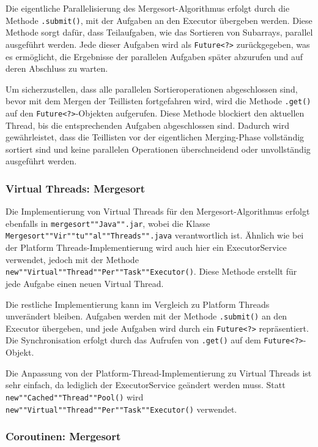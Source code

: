 \documentclass[fontsize=12pt,paper=a4,twoside=semi,parskip=half-,headsepline,headinclude]{scrreprt}
\begin{document}
Die eigentliche Parallelisierung des Mergesort-Algorithmus erfolgt durch die Methode \texttt{.submit()}, mit der Aufgaben an den Executor übergeben werden. Diese Methode sorgt dafür, dass Teilaufgaben, wie das Sortieren von Subarrays, parallel ausgeführt werden. Jede dieser Aufgaben wird als \texttt{Future<?>} zurückgegeben, was es ermöglicht, die Ergebnisse der parallelen Aufgaben später abzurufen und auf deren Abschluss zu warten.

Um sicherzustellen, dass alle parallelen Sortieroperationen abgeschlossen sind, bevor mit dem Mergen der Teillisten fortgefahren wird, wird die Methode \texttt{.get()} auf den \texttt{Future<?>}-Objekten aufgerufen. Diese Methode blockiert den aktuellen Thread, bis die entsprechenden Aufgaben abgeschlossen sind. Dadurch wird gewährleistet, dass die Teillisten vor der eigentlichen Merging-Phase vollständig sortiert sind und keine parallelen Operationen überschneidend oder unvollständig ausgeführt werden.

\subsubsection{Virtual Threads: Mergesort}

Die Implementierung von Virtual Threads für den Mergesort-Algorithmus erfolgt ebenfalls in \texttt{mergesort""Java"".jar}, wobei die Klasse \texttt{Mergesort""Vir""tu""al""Threads"".java} verantwortlich ist. Ähnlich wie bei der Platform Threads-Implementierung wird auch hier ein ExecutorService verwendet, jedoch mit der Methode \texttt{new""Virtual""Thread""Per""Task""Executor()}. Diese Methode erstellt für jede Aufgabe einen neuen Virtual Thread.

Die restliche Implementierung kann im Vergleich zu Platform Threads unverändert bleiben. Aufgaben werden mit der Methode \texttt{.submit()} an den Executor übergeben, und jede Aufgaben wird durch ein \texttt{Future<?>} repräsentiert. Die Synchronisation erfolgt durch das Aufrufen von \texttt{.get()} auf dem \texttt{Future<?>}-Objekt.

Die Anpassung von der Platform-Thread-Implementierung zu Virtual Threads ist sehr einfach, da lediglich der ExecutorService geändert werden muss. Statt \texttt{new""Cached""Thread""Pool()} wird \texttt{new""Virtual""Thread""Per""Task""Executor()} verwendet.

\subsubsection{Coroutinen: Mergesort}
\end{document}
